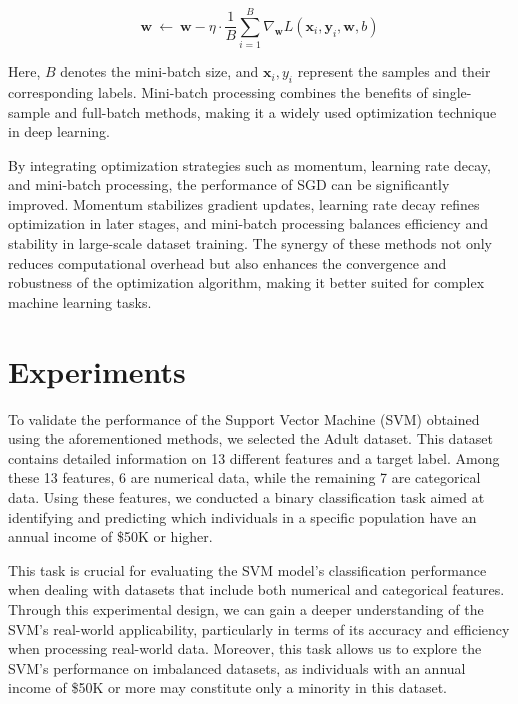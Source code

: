 \documentclass[a4paper, utf8]{ctexart}
\begin{document}
	\vspace{-.75em}
	\begin{equation}
		\boldsymbol{w} \ \leftarrow \ \boldsymbol{w} - \eta \cdot \frac{1}{B}\sum_{i=1}^{B}\nabla_{\boldsymbol{w}}L(\boldsymbol{x}_i, \boldsymbol{y}_i, \boldsymbol{w}, b)
	\end{equation}

	Here, $B$ denotes the mini-batch size, and $\boldsymbol{x}_i, y_i$ represent the samples and their corresponding labels. Mini-batch processing combines the benefits of single-sample and full-batch methods, making it a widely used optimization technique in deep learning.
	
	\vspace{1em}
	
	By integrating optimization strategies such as momentum, learning rate decay, and mini-batch processing, the performance of SGD can be significantly improved. Momentum stabilizes gradient updates, learning rate decay refines optimization in later stages, and mini-batch processing balances efficiency and stability in large-scale dataset training. The synergy of these methods not only reduces computational overhead but also enhances the convergence and robustness of the optimization algorithm, making it better suited for complex machine learning tasks.
	
	\section{Experiments}
	
	To validate the performance of the Support Vector Machine (SVM) obtained using the aforementioned methods, we selected the Adult dataset. This dataset contains detailed information on 13 different features and a target label. Among these 13 features, 6 are numerical data, while the remaining 7 are categorical data. Using these features, we conducted a binary classification task aimed at identifying and predicting which individuals in a specific population have an annual income of \$50K or higher.
	
	This task is crucial for evaluating the SVM model's classification performance when dealing with datasets that include both numerical and categorical features. Through this experimental design, we can gain a deeper understanding of the SVM's real-world applicability, particularly in terms of its accuracy and efficiency when processing real-world data. Moreover, this task allows us to explore the SVM's performance on imbalanced datasets, as individuals with an annual income of \$50K or more may constitute only a minority in this dataset.
	
\end{document}

